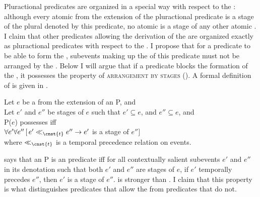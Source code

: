 \documentclass[output=paper,colorlinks,citecolor=brown,newtxmath]{langsci/langscibook}
\begin{document}
Pluractional predicates are organized in a special way with respect to the : although every atomic  from the extension of the pluractional predicate is a stage of the plural  denoted by this predicate, no atomic  is a stage of any other atomic . I claim that other predicates allowing the derivation of the  are organized exactly as pluractional predicates with respect to the . I propose that for a predicate to be able to form the , subevents making up the  of this predicate must not be arranged by the . Below I will argue that if a predicate blocks the formation of the , it possesses the property of \textsc{arrangement by stages} (). A formal definition of  is given in .

\ea \label{ex:naumov:34}
Let $e$ be a  from the extension of an  P, and \\
Let $e'$ and $e''$ be stages of $e$ such that
\ea $e' \subseteq e$, and
\ex $e'' \subseteq e$, and\smallskip\\
P($e$) possesses  iff \\
$\forall e' \forall e''\,[\,e' \ll_{\cnst{t}} e'' \rightarrow e'$ is a stage of $e'']$\smallskip\\
where $\ll_{\cnst{t}}$ is a temporal precedence relation on events.
\z \z

\noindent {} says that an  P is an  predicate iff for all contextually salient subevents $e'$ and $e''$ in its denotation such that both $e'$ and $e''$ are stages of $e$, if $e'$ temporally precedes $e''$, then $e'$ is a stage of $e''$.  is stronger than . I claim that this property is what distinguishes predicates that allow the  from predicates that do not.
\end{document}
